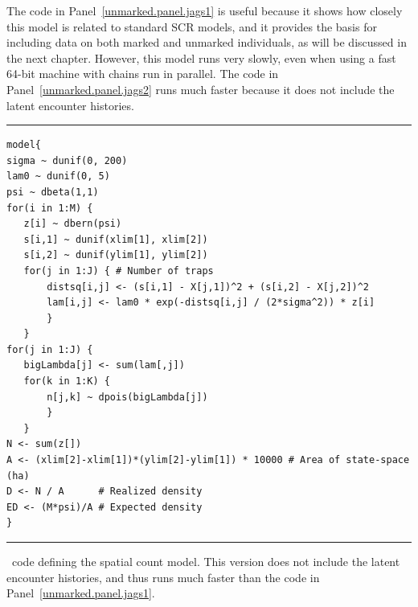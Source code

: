 The code in Panel~\ref{unmarked.panel.jags1} %
is useful because it shows how
closely this model is related to standard SCR models, and it provides
the basis for including data on both marked and unmarked individuals,
as will be discussed in the next chapter. However, this model runs
very slowly, even when using a fast 64-bit machine with chains run in parallel. The code
in Panel~\ref{unmarked.panel.jags2} runs much faster because it
does not include the latent encounter histories. %

\begin{panel}[ht]
\centering
\rule[0.05in]{\textwidth}{.03in}
\begin{small}
\begin{verbatim}
model{
sigma ~ dunif(0, 200)
lam0 ~ dunif(0, 5)
psi ~ dbeta(1,1)
for(i in 1:M) {
   z[i] ~ dbern(psi)
   s[i,1] ~ dunif(xlim[1], xlim[2])
   s[i,2] ~ dunif(ylim[1], ylim[2])
   for(j in 1:J) { # Number of traps
       distsq[i,j] <- (s[i,1] - X[j,1])^2 + (s[i,2] - X[j,2])^2
       lam[i,j] <- lam0 * exp(-distsq[i,j] / (2*sigma^2)) * z[i]
       }
   }
for(j in 1:J) {
   bigLambda[j] <- sum(lam[,j])
   for(k in 1:K) {
       n[j,k] ~ dpois(bigLambda[j])
       }
   }
N <- sum(z[])
A <- (xlim[2]-xlim[1])*(ylim[2]-ylim[1]) * 10000 # Area of state-space (ha)
D <- N / A      # Realized density
ED <- (M*psi)/A # Expected density
}
\end{verbatim}
\end{small}
\rule[0.15in]{\textwidth}{.03in}
\caption{\jags~code defining the spatial count model. This version
  does not include the latent encounter histories, and thus runs much
  faster than the code in Panel~\ref{unmarked.panel.jags1}.}
\label{unmarked.panel.jags2}
\end{panel}



